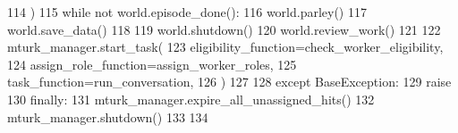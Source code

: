 \begin{DoxyCode}
114             )
115             \textcolor{keywordflow}{while} \textcolor{keywordflow}{not} world.episode\_done():
116                 world.parley()
117             world.save\_data()
118 
119             world.shutdown()
120             world.review\_work()
121 
122         mturk\_manager.start\_task(
123             eligibility\_function=check\_worker\_eligibility,
124             assign\_role\_function=assign\_worker\_roles,
125             task\_function=run\_conversation,
126         )
127 
128     \textcolor{keywordflow}{except} BaseException:
129         \textcolor{keywordflow}{raise}
130     \textcolor{keywordflow}{finally}:
131         mturk\_manager.expire\_all\_unassigned\_hits()
132         mturk\_manager.shutdown()
133 
134 
\end{DoxyCode}
